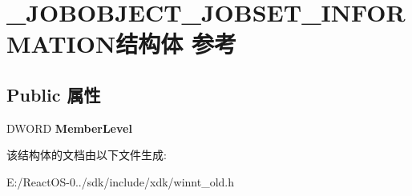 \hypertarget{struct___j_o_b_o_b_j_e_c_t___j_o_b_s_e_t___i_n_f_o_r_m_a_t_i_o_n}{}\section{\+\_\+\+J\+O\+B\+O\+B\+J\+E\+C\+T\+\_\+\+J\+O\+B\+S\+E\+T\+\_\+\+I\+N\+F\+O\+R\+M\+A\+T\+I\+O\+N结构体 参考}
\label{struct___j_o_b_o_b_j_e_c_t___j_o_b_s_e_t___i_n_f_o_r_m_a_t_i_o_n}
\subsection*{Public 属性}
\begin{DoxyCompactItemize}
\item 
\mbox{\label{struct___j_o_b_o_b_j_e_c_t___j_o_b_s_e_t___i_n_f_o_r_m_a_t_i_o_n_a0e05a92667d01a295a8eb0604339bb09}} 
D\+W\+O\+RD {\bfseries Member\+Level}
\end{DoxyCompactItemize}


该结构体的文档由以下文件生成\+:\begin{DoxyCompactItemize}
\item 
E\+:/\+React\+O\+S-\/0../sdk/include/xdk/winnt\+\_\+old.\+h\end{DoxyCompactItemize}
